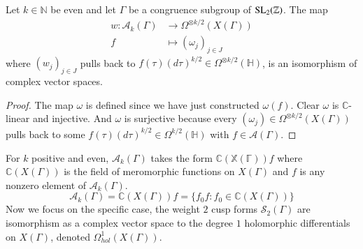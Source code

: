 \begin{theorem}
    Let $k\in \mathbb{N}$ be even and let $\Gamma$ be a congruence subgroup of ${\rm SL_2}(\mathbb{Z})$. The map
    \begin{align*}
        w:\mathcal{A}_k(\Gamma) & \longrightarrow  \Omega^{\otimes k/2}(X(\Gamma))\\
        f & \longmapsto  (\omega_j)_{j\in J}
    \end{align*}
    where $(w_j)_{j\in J}$ pulls back to $f(\tau)(d\tau)^{k/2} \in \Omega ^{\otimes k/2}(\mathbb{H})$, is an isomorphism
    of complex vector spaces.
\end{theorem}
\begin{proof}
    The map $\omega$ is defined since we have just constructed $\omega(f)$. Clear $\omega$ is $\mathbb{C}$-linear and injective.
    And $\omega$ is surjective because every $(\omega_j)\in \Omega ^{\otimes k/2}(X(\Gamma))$ pulls back to some 
    $f(\tau)(d\tau)^{k/2}\in \Omega^{k/2}(\mathbb{H})$ with $f \in \mathcal{A}(\Gamma)$.
\end{proof}
For $k$ positive and even, $\mathcal{A}_k(\Gamma)$ takes the form $\mathbb{C(X(\Gamma))}f$ where $\mathbb{C}(X(\Gamma))$ is the 
field of meromorphic functions on $X(\Gamma)$ and $f$ is any nonzero element of $\mathcal{A}_k(\Gamma)$. 
\begin{equation*}
    \mathcal{A}_k(\Gamma)=\mathbb{C}(X(\Gamma))f=\{f_0f:f_0\in \mathbb{C}(X(\Gamma))\}
\end{equation*}
Now we focus on the specific case, the weight $2$ cusp forms $\mathcal{S}_2(\Gamma)$ are isomorphism as a complex vector
space to the degree $1$ holomorphic differentials on $X(\Gamma)$, denoted $\Omega^{1}_{hol}(X(\Gamma))$. 
